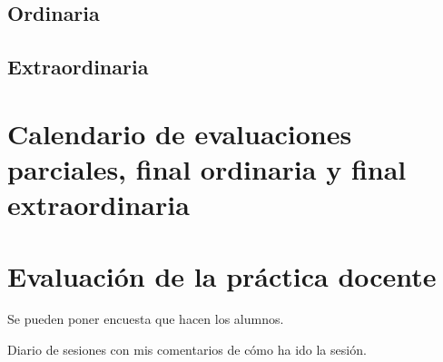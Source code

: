 	\subsection{Ordinaria}
	\subsection{Extraordinaria}
	\section{Calendario de evaluaciones parciales, final ordinaria y final extraordinaria}

\section{Evaluación de la práctica docente}

Se pueden poner encuesta que hacen los alumnos.

Diario de sesiones con mis comentarios de cómo ha ido la sesión.
